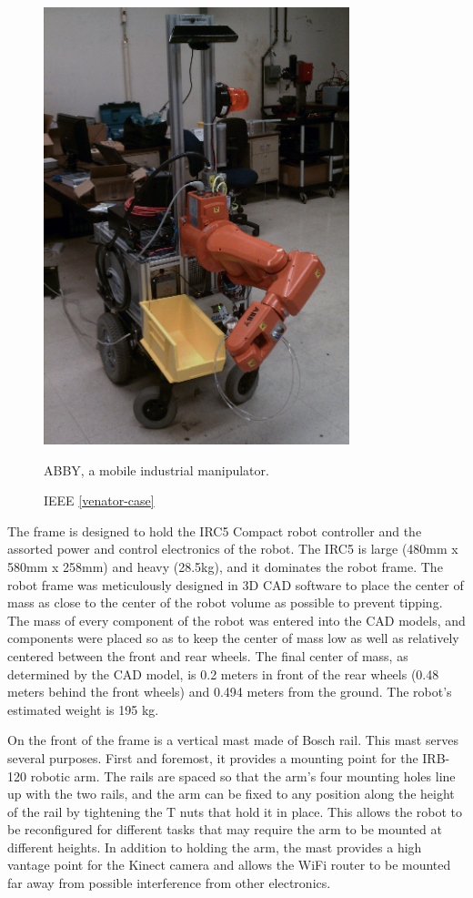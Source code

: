 \documentclass[]{cwru} %
\begin{document}
\begin{figure}[h]
\centering
\includegraphics[height=5.0in]{abby_2_edited}
\caption{ABBY, a mobile industrial manipulator.}
\caption*{ IEEE \ref{venator-case}}
\label{fig:abby-photo}
\end{figure}

The frame is designed to hold the IRC5 Compact robot controller and the
assorted power and control electronics of the robot. The IRC5 is large
(480mm x 580mm x 258mm) and heavy (28.5kg), and it dominates the robot
frame. The robot frame was meticulously designed in 3D CAD software to
place the center of mass as close to the center of the robot volume as
possible to prevent tipping. The mass of every component of the robot
was entered into the CAD models, and components were placed so as to
keep the center of mass low as well as relatively centered between the
front and rear wheels. The final center of mass, as determined by the
CAD model, is 0.2 meters in front of the rear wheels (0.48 meters behind
the front wheels) and 0.494 meters from the ground. The robot's
estimated weight is 195 kg.

On the front of the frame is a vertical mast made of Bosch rail. This
mast serves several purposes. First and foremost, it provides a mounting
point for the IRB-120 robotic arm. The rails are spaced so that the
arm's four mounting holes line up with the two rails, and the arm can be
fixed to any position along the height of the rail by tightening the T
nuts that hold it in place. This allows the robot to be reconfigured for
different tasks that may require the arm to be mounted at different
heights. In addition to holding the arm, the mast provides a high
vantage point for the Kinect camera and allows the WiFi router to be
mounted far away from possible interference from other electronics.
\end{document}
